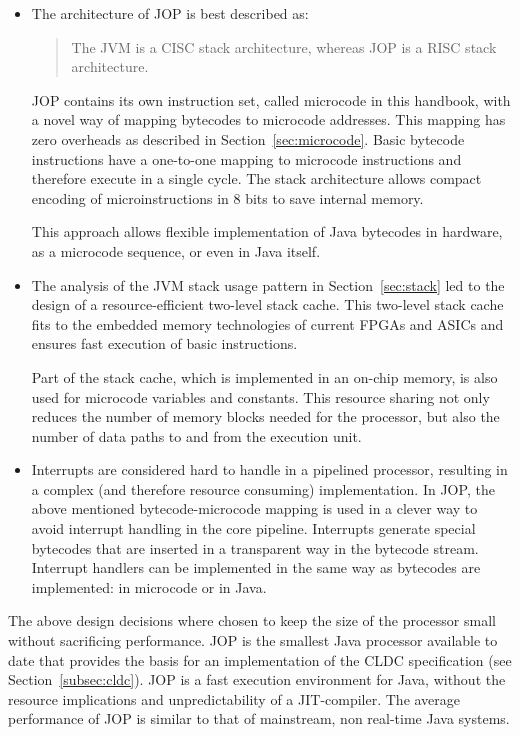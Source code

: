 \begin{itemize}

    \item
The architecture of JOP is best described as:
\begin{quote}
    The JVM is a CISC stack architecture, whereas JOP is a RISC stack
    architecture.
\end{quote}
JOP contains its own instruction set, called microcode in this
handbook, with a novel way of mapping bytecodes to microcode
addresses. This mapping has zero overheads as described in
Section~\ref{sec:microcode}. Basic bytecode instructions have a
one-to-one mapping to microcode instructions and therefore
execute in a single cycle. The stack architecture allows compact
encoding of microinstructions in 8 bits to save internal memory.

This approach allows flexible implementation of Java bytecodes in
hardware, as a microcode sequence, or even in Java itself.

    \item
The analysis of the JVM stack usage pattern in
Section~\ref{sec:stack} led to the design of a resource-efficient
two-level stack cache. This two-level stack cache fits to the
embedded memory technologies of current FPGAs and ASICs and ensures
fast execution of basic instructions.

Part of the stack cache, which is implemented in an on-chip
memory, is also used for microcode variables and constants. This
resource sharing not only reduces the number of memory blocks
needed for the processor, but also the number of data paths to
and from the execution unit.

    \item
Interrupts are considered hard to handle in a pipelined processor,
resulting in a complex (and therefore resource consuming)
implementation. In JOP, the above mentioned bytecode-microcode
mapping is used in a clever way to avoid interrupt handling in the
core pipeline.
%
%
Interrupts generate special bytecodes that are inserted in a
transparent way in the bytecode stream. Interrupt handlers can be
implemented in the same way as bytecodes are implemented: in
microcode or in Java.


\end{itemize}

The above design decisions where chosen to keep the size of the
processor small without sacrificing performance. JOP is the smallest
Java processor available to date that provides the basis for an
implementation of the CLDC specification (see
Section~\ref{subsec:cldc}). JOP is a fast execution environment for
Java, without the resource implications and unpredictability of a
JIT-compiler. The average performance of JOP is similar to that of
mainstream, non real-time Java systems.

